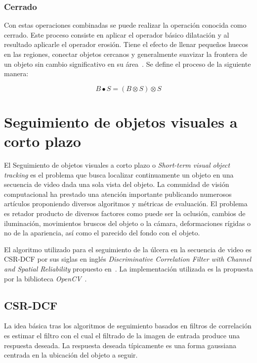\subsubsection{Cerrado}

Con estas operaciones combinadas se puede realizar la operación conocida como cerrado. Este proceso consiste en aplicar el operador básico dilatación y al resultado aplicarle el operador erosión. Tiene el efecto de llenar pequeños huecos en las regiones, conectar objetos cercanos y generalmente suavizar la frontera de un objeto sin cambio significativo en su área~\cite{}. Se define el proceso de la siguiente manera:

\begin{equation}
	B \bullet S = (B \otimes S) \otimes S
\end{equation}

\section{Seguimiento de objetos visuales a corto plazo}\label{section:tracking}

El Seguimiento de objetos visuales a corto plazo o \textit{Short-term visual object tracking} es el problema  que busca localizar continuamente un objeto en una secuencia de video dada una sola vista del objeto. La comunidad de visión computacional ha prestado una atención importante publicando numerosos artículos proponiendo diversos algoritmos y métricas de evaluación. El problema es retador producto de diversos factores como puede ser la oclusión, cambios de iluminación, movimientos bruscos del objeto o la cámara, deformaciones rígidas o no de la apariencia, así como el parecido del fondo con el objeto.	

El algoritmo utilizado para el seguimiento de la úlcera en la secuencia de video es CSR-DCF por sus siglas en inglés \textit{Discriminative Correlation Filter with Channel and Spatial Reliability} propuesto en~\cite{lunevzivc2018discriminative}. La implementación utilizada es la propuesta por la biblioteca \textit{OpenCV}~\cite{bradski2000opencv}.

\subsection{CSR-DCF}

La idea básica tras los algoritmos de seguimiento basados en filtros de correlación es estimar el filtro con el cual el filtrado de la imagen de entrada produce una respuesta deseada. La respuesta deseada típicamente es una forma gaussiana centrada en la ubicación del objeto a seguir.

